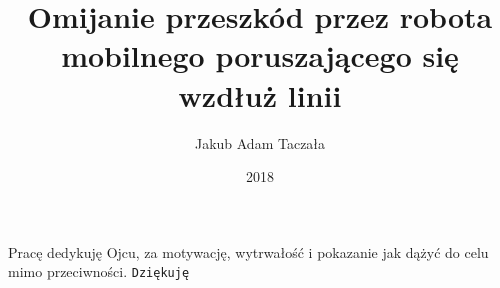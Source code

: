 \documentclass[12pt, eng, oneside, openany, final]{mgr}
\author{Jakub Adam Taczała}
\title{Omijanie przeszkód przez robota mobilnego poruszającego się wzdłuż linii}
\date{2018}
\begin{document}
\maketitle
\dedication{6cm}{Pracę dedykuję Ojcu, za motywację, wytrwałość i pokazanie jak dążyć do celu mimo przeciwności. \texttt{Dziękuję}}

\tableofcontents
\listoffigures
\listoftables

\newpage


%



\end{document}
